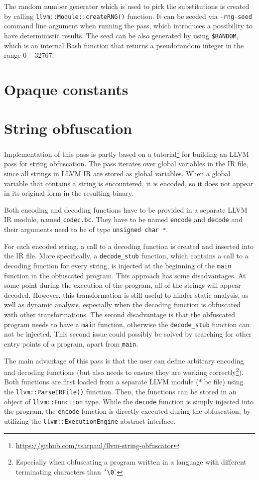 \documentclass[
  digital, %
  table,   %
  twoside, %
  nolof,     %
  nolot,     %
]{fithesis3}
\theoremstyle{definition}
\begin{document}
The random number generator which is used to pick the substitutions is created by calling \texttt{llvm::Module::createRNG()} function. It can be seeded via \texttt{-rng-seed} command line argument when running the pass, which introduces a possibility to have deterministic results. The seed can be also generated by using \texttt{\$RANDOM}, which is an internal Bash function that returns a pseudorandom integer in the range 0 -- 32767.

\section{Opaque constants}

\section{String obfuscation}
Implementation of this pass is partly based on a tutorial\footnote{\url{https://github.com/tsarpaul/llvm-string-obfuscator}} for building an LLVM pass for string obfuscation. The pass iterates over global variables in the IR file, since all strings in LLVM IR are stored as global variables. When a global variable that contains a string is encountered, it is encoded, so it does not appear in its original form in the resulting binary. 

Both encoding and decoding functions have to be provided in a separate LLVM IR module, named \texttt{codec.bc}. They have to be named \texttt{encode} and \texttt{decode} and their arguments need to be of type \texttt{unsigned char *}. 

For each encoded string, a call to a decoding function is created and inserted into the IR file. More specifically, a \texttt{decode\_stub} function, which contains a call to a decoding function for every string, is injected at the beginning of the \texttt{main} function in the obfuscated program. This approach has some disadvantages. At some point during the execution of the program, all of the strings will appear decoded. However, this transformation is still useful to hinder static analysis, as well as dynamic analysis, especially when the decoding function is obfuscated with other transformations. The second disadvantage is that the obfuscated program needs to have a \texttt{main} function, otherwise the \texttt{decode\_stub} function can not be injected. This second issue could possibly be solved by searching for other entry points of a program, apart from \texttt{main}.

The main advantage of this pass is that the user can define arbitrary encoding and decoding functions (but also needs to ensure they are working correctly\footnote{Especially when obfuscating a program written in a language with different terminating characters than \texttt{'\textbackslash0}'.}). Both functions are first loaded from a separate LLVM module (*.bc file) using the \texttt{llvm::ParseIRFile()} function. Then, the functions can be stored in an object of \texttt{llvm::Function} type. While the \texttt{decode} function is simply injected into the program, the \texttt{encode} function is directly executed during the obfuscation, by utilizing the \texttt{llvm::ExecutionEngine} abstract interface.
\end{document}
